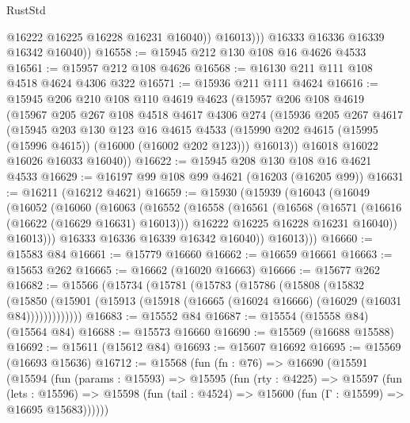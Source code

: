 \begin{lexlean}{RustStd}
\begin{coremodule}
{\begin{coremodule}
{{{{{{{{{{{{{{{{{{{{{{{{{{{{{{{{{{{{{{{{{{{{{{{{{{{{{{{{{{{{                  @16222
                  @16225
                  @16228
                  @16231
                  @16040))
              @16013)))
        @16333
        @16336
        @16339
        @16342
        @16040))
@16558 := @15945 @212 @130 @108 @16 @4626 @4533
@16561 := @15957 @212 @108 @4626
@16568 := @16130 @211 @111 @108 @4518 @4624 @4306 @322
@16571 := @15936 @211 @111 @4624
@16616 := @15945
    @206
    @210
    @108
    @110
    @4619
    @4623
    (@15957
      @206
      @108
      @4619
      (@15967
        @205
        @267
        @108
        @4518
        @4617
        @4306
        @274
        (@15936
          @205
          @267
          @4617
          (@15945
            @203
            @130
            @123
            @16
            @4615
            @4533
            (@15990 @202 @4615 (@15995 (@15996 @4615)) (@16000 (@16002 @202 @123)))
            @16013))
        @16018
        @16022
        @16026
        @16033
        @16040))
@16622 := @15945 @208 @130 @108 @16 @4621 @4533
@16629 := @16197 @99 @108 @99 @4621 (@16203 (@16205 @99))
@16631 := @16211 (@16212 @4621)
@16659 := @15930
    (@15939
      (@16043
        (@16049
          (@16052
            (@16060
              (@16063
                (@16552
                  (@16558
                    (@16561
                      (@16568
                        (@16571 (@16616 (@16622 (@16629 @16631) @16013)))
                        @16222
                        @16225
                        @16228
                        @16231
                        @16040))
                    @16013)))
              @16333
              @16336
              @16339
              @16342
              @16040))
          @16013)))
@16660 := @15583 @84
@16661 := @15779 @16660
@16662 := @16659 @16661
@16663 := @15653 @262
@16665 := @16662 (@16020 @16663)
@16666 := @15677 @262
@16682 := @15566
    (@15734
      (@15781
        (@15783
          (@15786
            (@15808
              (@15832
                (@15850
                  (@15901 (@15913 (@15918 (@16665 (@16024 @16666) (@16029 (@16031 @84)))))))))))))
@16683 := @15552 @84
@16687 := @15554 (@15558 @84) (@15564 @84)
@16688 := @15573 @16660
@16690 := @15569 (@16688 @15588)
@16692 := @15611 (@15612 @84)
@16693 := @15607 @16692
@16695 := @15569 (@16693 @15636)
@16712 := @15568
    (fun (fn : @76) =>
    @16690
      (@15591
        (@15594
          (fun (params : @15593) =>
          @15595
            (fun (rty : @4225) =>
            @15597
              (fun (lets : @15596) =>
              @15598 (fun (tail : @4524) => @15600 (fun (Γ : @15599) => @16695 @15683))))))
}}}}}}}}}}}}}}}}}}}}}}}}}}}}}}}}}}}}}}}}}}}}}}}}}}}}}}}}}}}}
\end{coremodule}}
\end{coremodule}
\end{lexlean}
